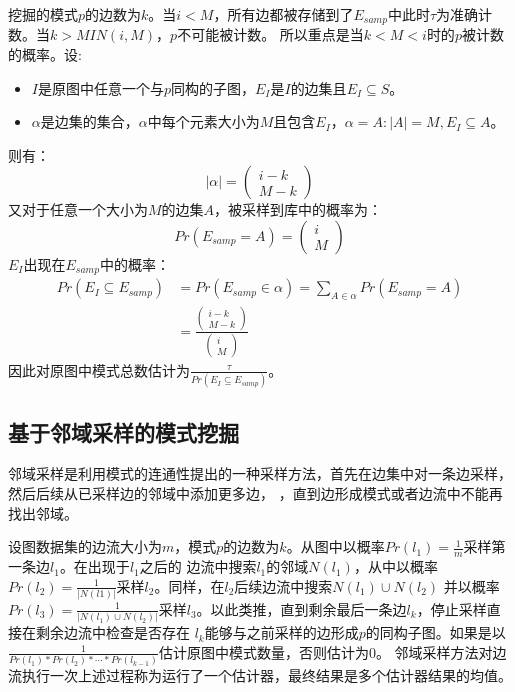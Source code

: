 \documentclass[master]{thesis-uestc}
\begin{document}
    挖掘的模式$p$的边数为$k$。当$i<M$，所有边都被存储到了$E_{samp}$中此时$\tau$为准确计数。当$k>MIN(i,M)$，$p$不可能被计数。
所以重点是当$k<M<i$时的$p$被计数的概率。设:
\begin{itemize}
    \item $I$是原图中任意一个与$p$同构的子图，$E_I$是$I$的边集且$E_I \subseteq S$。
    \item $\alpha$是边集的集合，$\alpha$中每个元素大小为$M$且包含$E_I$，$\alpha={A: |A| = M , E_I \subseteq A}$。
\end{itemize}
则有：
\begin{equation*}
    |\alpha|=\left(\begin{array}{c}
        i-k\\
        M-k
    \end{array}\right)
\end{equation*}
又对于任意一个大小为$M$的边集$A$，被采样到库中的概率为：
\begin{equation*}
    Pr(E_{samp}=A)=\left(\begin{array}{c}
        i\\
        M
    \end{array}\right)
\end{equation*}
$E_I$出现在$E_{samp}$中的概率：
\begin{equation*}
    \begin{aligned}
        Pr(E_I \subseteq E_{samp})&=Pr(E_{samp} \in \alpha)=\sum_{A\in\alpha}Pr(E_{samp}=A)\\
        &=\frac{\left(\begin{array}{c} i-k \\ M-k \end{array}\right)}{\left(\begin{array}{c} i \\ M \end{array}\right)}
    \end{aligned}
\end{equation*}
因此对原图中模式总数估计为$\frac{\tau}{Pr(E_I \subseteq E_{samp})}$。
 
\subsection{基于邻域采样的模式挖掘}
\label{subsec:neighbor}
    邻域采样是利用模式的连通性提出的一种采样方法，首先在边集中对一条边采样，然后后续从已采样边的邻域中添加更多边，
，直到边形成模式或者边流中不能再找出邻域。

    设图数据集的边流大小为$m$，模式$p$的边数为$k$。从图中以概率$Pr(l_1)=\frac{1}{m}$采样第一条边$l_1$。在出现于$l_1$之后的
边流中搜索$l_1$的邻域$N(l_1)$，从中以概率$Pr(l_2)=\frac{1}{|N(l1)|}$采样$l_2$。同样，在$l_2$后续边流中搜索$N(l_1) \cup N(l_2)$
并以概率$Pr(l_3)=\frac{1}{|N(l_1) \cup N(l_2)|}$采样$l_3$。以此类推，直到剩余最后一条边$l_k$，停止采样直接在剩余边流中检查是否存在
$l_k$能够与之前采样的边形成$p$的同构子图。如果是以$\frac{1}{Pr(l_1)*Pr(l_2)*\cdots*Pr(l_{k-1})}$估计原图中模式数量，否则估计为0。
邻域采样方法对边流执行一次上述过程称为运行了一个估计器，最终结果是多个估计器结果的均值。
\end{document}
